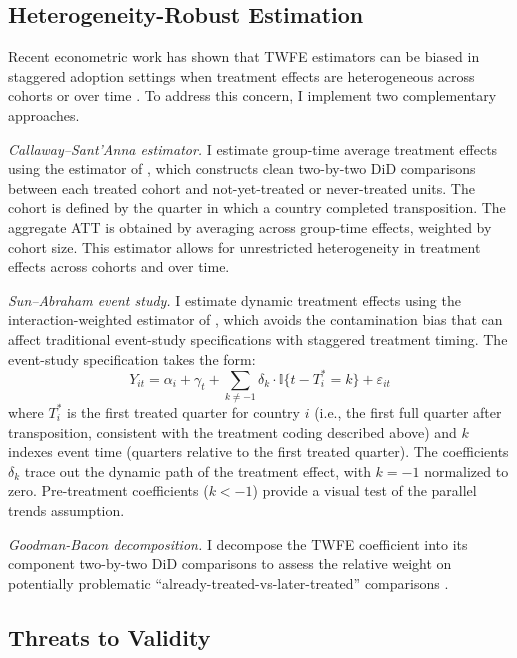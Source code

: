 \documentclass[12pt]{article}
\newcommand{\ind}{\mathbb{I}}
\begin{document}
\subsection{Heterogeneity-Robust Estimation}

Recent econometric work has shown that TWFE estimators can be biased in staggered adoption settings when treatment effects are heterogeneous across cohorts or over time \citep{goodmanbacon2021, deChaisemartinDhaultfoeuille2020, sunAbraham2021}. To address this concern, I implement two complementary approaches.

\textit{Callaway--Sant'Anna estimator.} I estimate group-time average treatment effects using the estimator of \citet{callaway2021difference}, which constructs clean two-by-two DiD comparisons between each treated cohort and not-yet-treated or never-treated units. The cohort is defined by the quarter in which a country completed transposition. The aggregate ATT is obtained by averaging across group-time effects, weighted by cohort size. This estimator allows for unrestricted heterogeneity in treatment effects across cohorts and over time.

\textit{Sun--Abraham event study.} I estimate dynamic treatment effects using the interaction-weighted estimator of \citet{sunAbraham2021}, which avoids the contamination bias that can affect traditional event-study specifications with staggered treatment timing. The event-study specification takes the form:
\begin{equation}
Y_{it} = \alpha_i + \gamma_t + \sum_{k \neq -1} \delta_k \cdot \ind\{t - T_i^* = k\} + \varepsilon_{it}
\label{eq:eventstudy}
\end{equation}
where $T_i^*$ is the first treated quarter for country $i$ (i.e., the first full quarter after transposition, consistent with the treatment coding described above) and $k$ indexes event time (quarters relative to the first treated quarter). The coefficients $\delta_k$ trace out the dynamic path of the treatment effect, with $k = -1$ normalized to zero. Pre-treatment coefficients ($k < -1$) provide a visual test of the parallel trends assumption.

\textit{Goodman-Bacon decomposition.} I decompose the TWFE coefficient into its component two-by-two DiD comparisons to assess the relative weight on potentially problematic ``already-treated-vs-later-treated'' comparisons \citep{goodmanbacon2021}.

\subsection{Threats to Validity}
\end{document}
